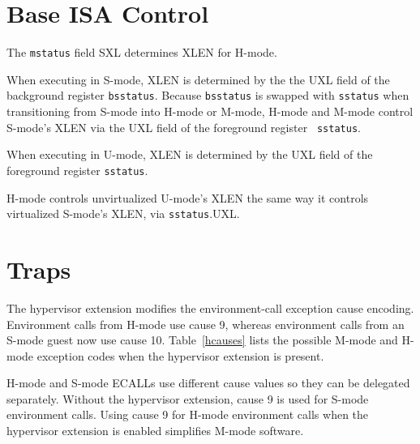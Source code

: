 \section{Base ISA Control}

The {\tt mstatus} field SXL determines XLEN for H-mode.

When executing in S-mode, XLEN is determined by the the UXL field of the
background register {\tt bsstatus}.  Because {\tt bsstatus} is swapped with
{\tt sstatus} when transitioning from S-mode into H-mode or M-mode, H-mode and
M-mode control S-mode's XLEN via the UXL field of the foreground register {\tt
sstatus}.

When executing in U-mode, XLEN is determined by the UXL field of the foreground register {\tt sstatus}.

\begin{commentary}
H-mode controls unvirtualized U-mode's XLEN the same way it controls virtualized S-mode's XLEN, via
{\tt sstatus}.UXL.
\end{commentary}

\section{Traps}

The hypervisor extension modifies the environment-call exception cause
encoding.  Environment calls from H-mode use cause 9, whereas environment
calls from an S-mode guest now use cause 10.  Table~\ref{hcauses} lists the
possible M-mode and H-mode exception codes when the hypervisor extension is
present.

\begin{commentary}
H-mode and S-mode ECALLs use different cause values so they can be delegated
separately.  Without the hypervisor extension, cause 9 is used for S-mode
environment calls.  Using cause 9 for H-mode environment calls when the
hypervisor extension is enabled simplifies M-mode software.
\end{commentary}

